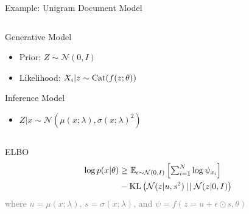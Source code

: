 \begin{frame}{Example: Unigram Document Model}

\begin{columns}
	\begin{column}{0.75\textwidth}  

		Generative Model
		\begin{itemize}
			\item Prior: $Z \sim \mathcal N(0, I)$
			\item Likelihood: $X_i|z \sim \operatorname{Cat}(f(z; \theta))$
		\end{itemize}
   		Inference Model
		\begin{itemize}
			\item $Z|x \sim \mathcal N(\mu(x; \lambda), \sigma(x; \lambda)^2)$
		\end{itemize}
    \end{column}
	\begin{column}{0.2\textwidth}
    \end{column}    
    \end{columns}
    \pause
    
    \vspace{10pt}
    
    \alert{ELBO}
    \vspace{-10pt}
	\begin{equation*}
	\begin{aligned}		
		\log p(x|\theta) &\ge \mathbb E_{\epsilon \sim \mathcal N(0, I)}\left[ \textstyle\sum_{i=1}^N \log \psi_{x_i}\right] \\
		&- \operatorname{KL}\left(\mathcal N(z|u, s^2)\mid\mid \mathcal N(z|0, I)\right)
	\end{aligned}
	\end{equation*}
	\textcolor{gray}{{\small where $u = \mu(x; \lambda)$, $s = \sigma(x; \lambda)$, and $\psi = f(z = u + \epsilon \odot s, \theta)$ }}

\end{frame}

